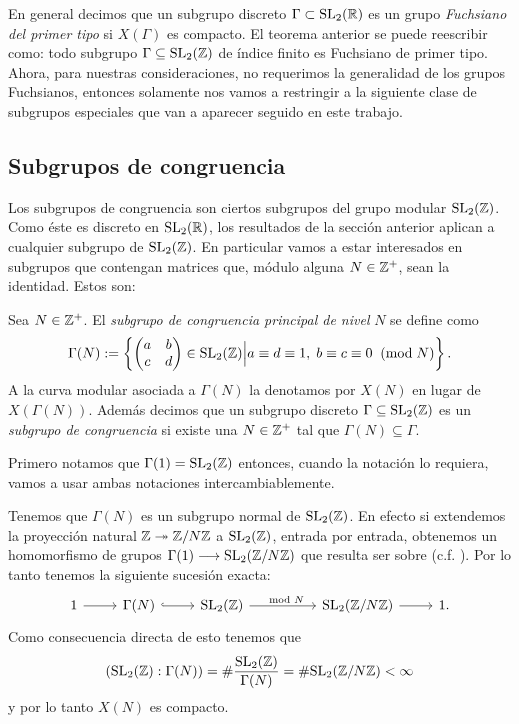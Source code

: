
En general decimos que un subgrupo discreto $\Gamma\subset\mathrm{SL}_2(\mathbb{R})$ es un grupo
\emph{Fuchsiano del primer tipo} si $X(\Gamma)$ es compacto. El teorema anterior se puede reescribir
como: todo subgrupo $\Gamma\subseteq\mathrm{SL}_2(\mathbb{Z})$ de \'indice finito es Fuchsiano de primer tipo.
Ahora, para nuestras consideraciones, no requerimos la generalidad de los grupos Fuchsianos, entonces
solamente nos vamos a restringir a la siguiente clase de subgrupos especiales que van a aparecer
seguido en este trabajo.

\subsection{Subgrupos de congruencia}\label{sec:subgruposdecongruencia}%

Los subgrupos de congruencia son ciertos subgrupos del grupo modular $\mathrm{SL}_2(\mathbb{Z})$. Como \'este
es discreto en $\mathrm{SL}_2(\mathbb{R})$, los resultados de la secci\'on anterior aplican a cualquier subgrupo
de $\mathrm{SL}_2(\mathbb{Z})$. En particular vamos a estar interesados en subgrupos que contengan matrices que,
m\'odulo alguna $N\in\mathbb{Z}^+$, sean la identidad. Estos son:

\begin{defin}
  Sea $N\in\mathbb{Z}^+$. El \emph{subgrupo de congruencia principal de nivel} $N$ se define como
  \[
    \Gamma(N):=
    \left\{ \begin{pmatrix}a & b\\ c & d\end{pmatrix}\in\mathrm{SL}_2(\mathbb{Z})\Big| a\equiv d\equiv 1,\; b\equiv c\equiv 0\;\;(\mathrm{mod}\; N)\right\}.
  \]
  A la curva modular asociada a $\Gamma(N)$ la denotamos por $X(N)$ en lugar de $X(\Gamma(N))$.
  Adem\'as decimos que un subgrupo discreto $\Gamma\subseteq\mathrm{SL}_2(\mathbb{Z})$ es un \emph{subgrupo de
    congruencia} si existe una $N\in\mathbb{Z}^+$ tal que $\Gamma(N)\subseteq\Gamma$.
\end{defin}


Primero notamos que $\Gamma(1)=\mathrm{SL}_2(\mathbb{Z})$ entonces, cuando la notaci\'on lo requiera, vamos a
usar ambas notaciones intercambiablemente.

Tenemos que $\Gamma(N)$ es un subgrupo normal de $\mathrm{SL}_2(\mathbb{Z})$. En efecto si extendemos la
proyecci\'on natural $\mathbb{Z}\twoheadrightarrow\mathbb{Z}/N\mathbb{Z}$ a $\mathrm{SL}_2(\mathbb{Z})$, entrada por entrada, obtenemos un
homomorfismo de grupos $\Gamma(1)\longrightarrow\mathrm{SL}_2(\mathbb{Z}/N\mathbb{Z})$ que resulta ser sobre (c.f.
\cite[\S1.6, lema 1.38]{ShimuraITTATOAF}). Por lo tanto tenemos la siguiente sucesi\'on
exacta:
\[
  \begin{tikzcd}
    1 \arrow[r] & \Gamma(N) \arrow[r,hookrightarrow] & \SL_2(\ZZ) \arrow[rr,"\mod N"] &&
    \SL_2(\ZZ/N\ZZ) \arrow[r] & 1.
  \end{tikzcd}
\]
Como consecuencia directa de esto tenemos que
\[
  (\mathrm{SL}_2(\mathbb{Z}):\Gamma(N))=\#\frac{\mathrm{SL}_2(\mathbb{Z})}{\Gamma(N)}=\#\mathrm{SL}_2(\mathbb{Z}/N\mathbb{Z})<\infty
\]
y por lo tanto $X(N)$ es compacto.

